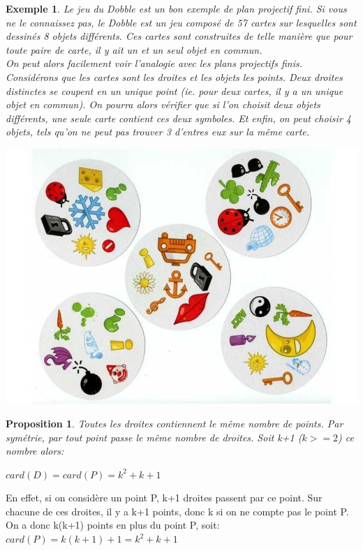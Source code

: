 \documentclass[a4paper]{article}
\newtheorem{Ex}{Exemple}[subsection]
\newtheorem{Prop}{Proposition}
\begin{document}
\begin{Ex}
Le jeu du Dobble est un bon exemple de plan projectif fini. Si vous ne le connaissez pas, le Dobble est un jeu composé de 57 cartes sur lesquelles sont dessinés 8 objets différents. Ces cartes sont construites de telle manière que pour toute paire de carte, il y ait un et un seul objet en commun. \\
On peut alors facilement voir l'analogie avec les plans projectifs finis. Considérons que les cartes sont les droites et les objets les points. Deux droites distinctes se coupent en un unique point (ie. pour deux cartes, il y a un unique objet en commun). On pourra alors vérifier que si l'on choisit deux objets différents, une seule carte contient ces deux symboles. Et enfin, on peut choisir 4 objets, tels qu'on ne peut pas trouver 3 d'entres eux sur la même carte.
\begin{center}
\includegraphics[scale=0.3]{dobble-2.jpg}
\end{center}
\end{Ex}
\begin{Prop}
Toutes les droites contiennent le même nombre de points. Par symétrie, par tout point passe le même nombre de droites. Soit k+1 ($k>=2$) ce nombre alors:
\begin{center}
$card(D)=card(P)=k^2+k+1$
\end{center}
\end{Prop}
En effet, si on considère un point P, k+1 droites passent par ce point. Sur chacune de ces droites, il y a k+1 points, donc k si on ne compte pas le point P. On a donc k(k+1) points en plus du point P, soit:	$card(P)=k(k+1)+1=k^2+k+1$
\end{document}
